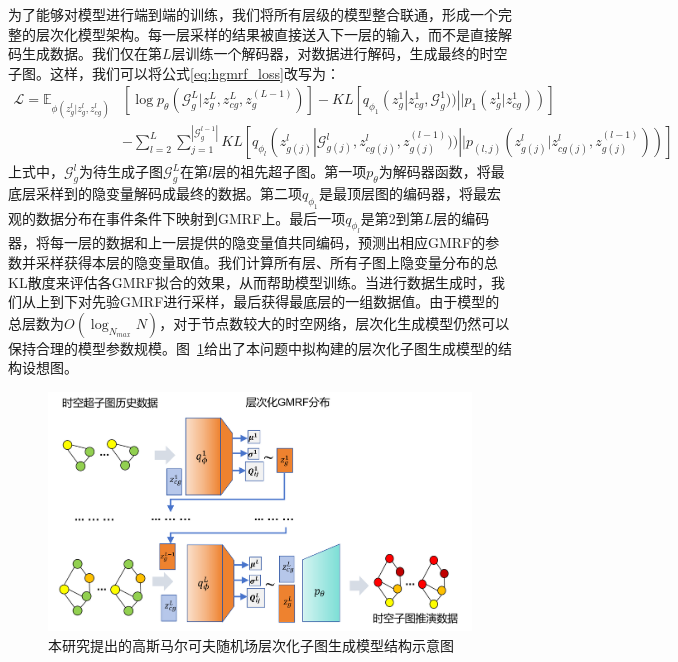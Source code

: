 \documentclass[12pt,UTF8,AutoFakeBold=2,a4paper]{ctexart} %
\begin{document}
为了能够对模型进行端到端的训练，我们将所有层级的模型整合联通，形成一个完整的层次化模型架构。每一层采样的结果被直接送入下一层的输入，而不是直接解码生成数据。我们仅在第$L$层训练一个解码器，对数据进行解码，生成最终的时空子图。这样，我们可以将公式\ref{eq:hgmrf_loss}改写为：
\begin{equation}
\begin{split}
    \mathcal{L} = \mathbb{E}_{{\phi}(z^l_g|z^l_g,z^l_{cg})}&[\log p_{\theta}(\mathcal{G}^L_g|z^L_g,z^L_{cg},z^{(L-1)}_g)]-KL[q_{\phi_1}(z^1_g|z^1_{cg},\mathcal{G}^1_g))||p_1(z^1_g|z^1_{cg}))]\\ &-\sum_{l=2}^L\sum_{j=1}^{|\mathcal{G}^{l-1}_g|}KL[q_{\phi_l}(z^l_{g(j)}|\mathcal{G}^l_{g(j)},z^l_{cg(j)},z^{(l-1)}_{g(j)}))||p_{(l,j)}(z^l_{g(j)}|z^l_{cg(j)}, z^{(l-1)}_{g(j)}))]
\end{split}
\end{equation}
上式中，$\mathcal{G}^{l}_g$为待生成子图$\mathcal{G}^{L}_g$在第$l$层的祖先超子图。第一项$p_\theta$为解码器函数，将最底层采样到的隐变量解码成最终的数据。第二项$q_{\phi_1}$是最顶层图的编码器，将最宏观的数据分布在事件条件下映射到GMRF上。最后一项$q_{\phi_l}$是第2到第$L$层的编码器，将每一层的数据和上一层提供的隐变量值共同编码，预测出相应GMRF的参数并采样获得本层的隐变量取值。我们计算所有层、所有子图上隐变量分布的总KL散度来评估各GMRF拟合的效果，从而帮助模型训练。当进行数据生成时，我们从上到下对先验GMRF进行采样，最后获得最底层的一组数据值。由于模型的总层数为$O(\log_{N_{max}}N)$，对于节点数较大的时空网络，层次化生成模型仍然可以保持合理的模型参数规模。图~\ref{fig:gmrf-hvae}给出了本问题中拟构建的层次化子图生成模型的结构设想图。
\begin{figure}
    \centering
    \includegraphics[width=1\linewidth]{fig/gmrf-hvae.png}
    \caption{本研究提出的高斯马尔可夫随机场层次化子图生成模型结构示意图}
    \label{fig:gmrf-hvae}
\end{figure}
\end{document}
